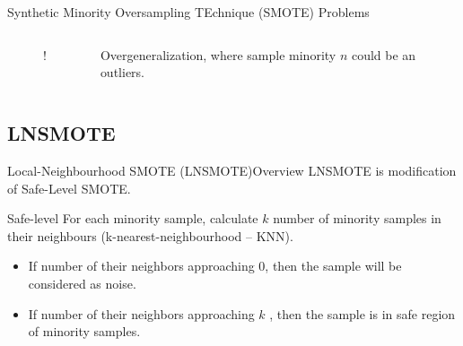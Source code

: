 \documentclass{beamer}
\begin{document}
\begin{frame}{Synthetic Minority Oversampling TEchnique (SMOTE)}
	{Problems}
	\begin{columns}
		\begin{column}{0.5\textwidth}
			\begin{figure}
			\centering
			\resizebox {\columnwidth} {!} {
			}
			\end{figure}
		\end{column}

		\begin{column}{0.5\textwidth}
			Overgeneralization, where sample minority $n$ could be an outliers.
		\end{column}
	\end{columns}
\end{frame}


\subsection{LNSMOTE}

\begin{frame}{Local-Neighbourhood SMOTE (LNSMOTE)}{Overview}
	LNSMOTE is modification of Safe-Level SMOTE.
	\begin{block}{Safe-level}
		For each minority sample, calculate $k$ number of minority samples in
		their neighbours (k-nearest-neighbourhood -- KNN).

		\begin{itemize}
		\item If number of their neighbors approaching 0, then the sample will
		be considered as noise.
		\item If number of their neighbors approaching $k$ , then the sample is
		in safe region of minority samples.
		\end{itemize}
	\end{block}
\end{frame}
\end{document}
